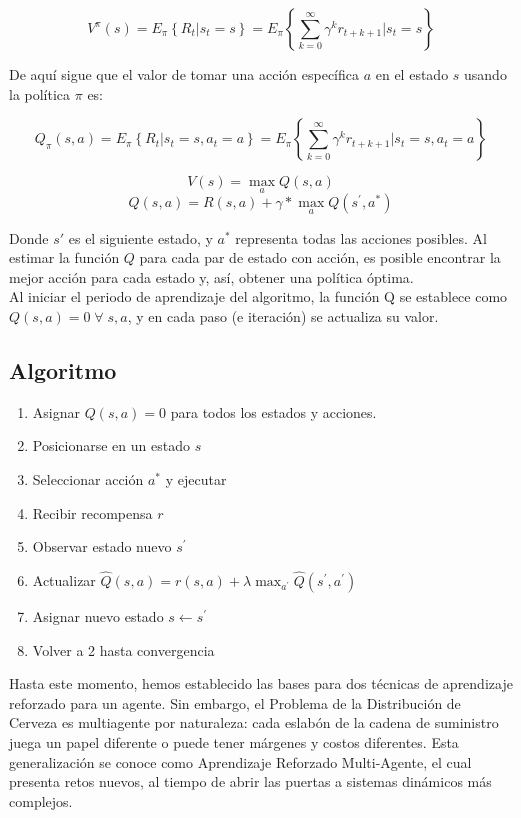 $$
V^{\pi}(s) = E_{\pi}\left\{R_{t}|s_{t} = s\right\} = E_{\pi}\left\{\sum_{k=0}^{\infty}\gamma^{k}r_{t+k+1}|s_{t}=s\right\}
$$

De aqu\'i sigue que el valor de tomar una acci\'on espec\'ifica $a$ en el estado $s$ usando la pol\'itica $\pi$ es:

$$
    Q_{\pi}(s,a) = E_{\pi}\left\{R_{t}|s_{t}=s,a_{t}=a\right\}=E_{\pi}\left \{\sum_{k = 0}^{\infty}\gamma^{k}r_{t+k+1}|s_{t} =s, a_{t} =a  \right \}
$$

$$
V(s) = \max_{a}{Q(s,a)}
$$
$$
Q(s, a) = R(s, a) + \gamma * \max_{a}{Q(s^{'}, a^{*})}
$$

Donde $s{'}$ es el siguiente estado, y $a^{*}$ representa todas las acciones posibles. Al estimar la funci\'on $Q$ para cada par de estado con acci\'on, es posible encontrar la mejor acci\'on para cada estado y, as\'i, obtener una pol\'itica \'optima.\\

Al iniciar el periodo de aprendizaje del algoritmo, la funci\'on Q se establece como $Q(s,a) = 0 \; \forall \; s, a$, y en cada paso (e iteraci\'on) se actualiza su valor.

\subsection{Algoritmo}

\begin{enumerate}
    \item Asignar $Q(s,a) = 0$ para todos los estados y acciones.
    \item Posicionarse en un estado $s$
    \item Seleccionar acci\'on $a^{*}$ y ejecutar
    \item Recibir recompensa $r$
    \item Observar estado nuevo $s^{'}$
    \item Actualizar $\hat{Q}(s,a) = r(s,a) + \lambda \max _{ a^{'} }{  \hat{Q}(s^{'},a^{'}) }$
    \item Asignar nuevo estado $s \leftarrow s^{'}$
    \item Volver a 2 hasta convergencia
\end{enumerate}

Hasta este momento, hemos establecido las bases para dos t\'ecnicas de aprendizaje reforzado para un agente. Sin embargo, el Problema de la Distribución de Cerveza es multiagente por naturaleza: cada eslab\'on de la cadena de suministro juega un papel diferente o puede tener m\'argenes y costos diferentes. Esta generalizaci\'on se conoce como Aprendizaje Reforzado Multi-Agente, el cual presenta retos nuevos, al tiempo de abrir las puertas a sistemas din\'amicos m\'as complejos.

